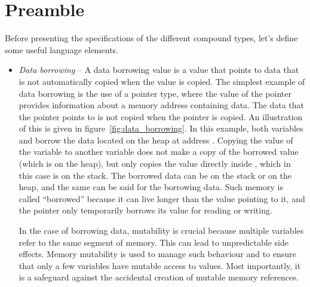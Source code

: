 \section{Preamble}%
\label{sec:preamble_compound_types}

Before presenting the specifications of the different compound types, let's
define some useful language elements.


\begin{itemize}
\item \textit{Data borrowing} -- A data borrowing value is a value that points
  to data that is not automatically copied when the value is copied. The
  simplest example of data borrowing is the use of a pointer type, where the
  value of the pointer provides information about a memory address containing
  data. The data that the pointer points to is not copied when the pointer is
  copied. An illustration of this is given in figure~\ref{fig:data_borrowing}.
  In this example, both variables  and  borrow the data
  located on the heap at address . Copying the value of the
  variable  to another variable does not make a copy of the borrowed
  value (which is on the heap), but only copies the value directly inside
  , which in this case is on the stack. The borrowed data can be on
  the stack or on the heap, and the same can be said for the borrowing data.
  Such memory is called ``borrowed'' because it can live longer than the value
  pointing to it, and the pointer only temporarily borrows its value for reading
  or writing.

  In the case of borrowing data, mutability is crucial because multiple variables
  refer to the same segment of memory. This can lead to unpredictable side
  effects. Memory mutability is used to manage such behaviour and to ensure that
  only a few variables have mutable access to values. Most importantly, it is a
  safeguard against the accidental creation of mutable memory references.


\end{itemize}

